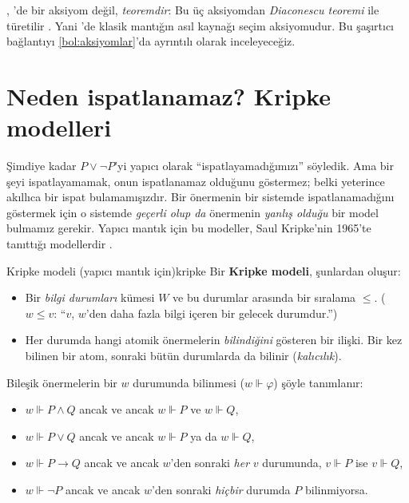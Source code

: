 , \Lean{}'de bir aksiyom değil, \emph{teoremdir}: Bu üç
aksiyomdan \emph{Diaconescu teoremi} ile türetilir \citep{diaconescu1975}.
Yani \Lean{}'de klasik mantığın asıl kaynağı seçim aksiyomudur. Bu
şaşırtıcı bağlantıyı \cref{bol:aksiyomlar}'da ayrıntılı olarak
inceleyeceğiz.

\section{Neden ispatlanamaz? Kripke modelleri}\label{sec:kripke-onizleme}

Şimdiye kadar $P \vee \neg P$'yi yapıcı olarak ``ispatlayamadığımızı''
söyledik. Ama bir şeyi ispatlayamamak, onun ispatlanamaz olduğunu
göstermez; belki yeterince akıllıca bir ispat bulamamışızdır. Bir
önermenin bir sistemde ispatlanamadığını göstermek için o sistemde
\emph{geçerli olup da} önermenin \emph{yanlış olduğu} bir model
bulmamız gerekir. Yapıcı mantık için bu modeller, Saul Kripke'nin
1965'te tanıttığı modellerdir \citep{kripke1965}.

\begin{tanim}{Kripke modeli (yapıcı mantık için)}{kripke}
Bir \textbf{Kripke modeli}, şunlardan oluşur:
\begin{itemize}
  \item Bir \emph{bilgi durumları} kümesi $W$ ve bu durumlar
        arasında bir sıralama $\leq$. ($w \leq v$: ``$v$, $w$'den daha
        fazla bilgi içeren bir gelecek durumdur.'')
  \item Her durumda hangi atomik önermelerin \emph{bilindiğini}
        gösteren bir ilişki. Bir kez bilinen bir atom, sonraki bütün
        durumlarda da bilinir (\emph{kalıcılık}).
\end{itemize}
Bileşik önermelerin bir $w$ durumunda bilinmesi ($w \Vdash \varphi$)
şöyle tanımlanır:
\begin{itemize}
  \item $w \Vdash P \wedge Q$ \;ancak ve ancak\; $w \Vdash P$ ve $w \Vdash Q$,
  \item $w \Vdash P \vee Q$ \;ancak ve ancak\; $w \Vdash P$ ya da $w \Vdash Q$,
  \item $w \Vdash P \to Q$ \;ancak ve ancak\; $w$'den sonraki \emph{her}
        $v$ durumunda, $v \Vdash P$ ise $v \Vdash Q$,
  \item $w \Vdash \neg P$ \;ancak ve ancak\; $w$'den sonraki \emph{hiçbir}
        durumda $P$ bilinmiyorsa.
\end{itemize}
\end{tanim}

